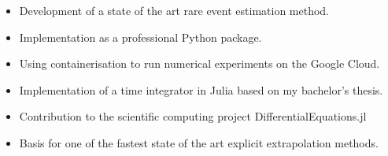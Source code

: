 \begin{itemize}
\item Development of a state of the art rare event estimation method.
\item Implementation as a professional Python package.
\item Using containerisation to run numerical experiments on the Google Cloud.
\end{itemize}
\quad\newline
{}
\begin{itemize}
\item Implementation of a time integrator in Julia based on my bachelor’s thesis.
\item Contribution to the scientific computing project  DifferentialEquations.jl
\item Basis for one of the fastest state of the art explicit extrapolation methods.
\end{itemize}
\quad\newline